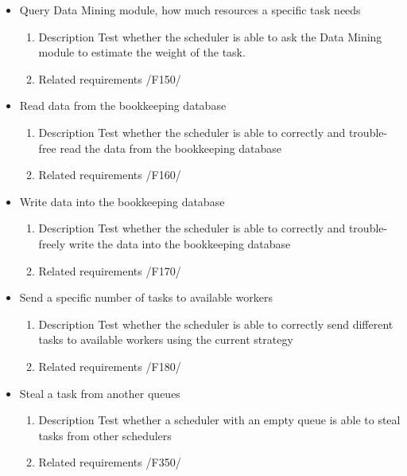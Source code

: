 {\begin{itemize}
				\item Query Data Mining module, how much resources a specific task needs
				\begin{enumerate}
					\item Description\newline
Test whether the scheduler is able to ask the Data Mining module to estimate the weight of the task.
					\item Related requirements\newline
						/F150/
				\end{enumerate}
				
				
				\item Read data from the bookkeeping database
				\begin{enumerate}
					\item Description\newline
Test whether the scheduler is able to correctly and trouble-free read the data from the bookkeeping database
					\item Related requirements\newline
						/F160/
				\end{enumerate}
				
				
				\item Write data into the bookkeeping database
				\begin{enumerate}
					\item Description\newline
Test whether the scheduler is able to correctly and trouble-freely write the data into the bookkeeping database
					\item Related requirements\newline
						/F170/
				\end{enumerate}
				
				
				\item Send a specific number of tasks to available workers
				\begin{enumerate}
					\item Description\newline
Test whether the scheduler is able to correctly send different tasks to available workers using the current strategy
					\item Related requirements\newline
						/F180/
				\end{enumerate}
								
			
			
			
				\item Steal a task from another queues
				\begin{enumerate}
					\item Description\newline
Test whether a scheduler with an empty queue is able to steal tasks from other schedulers
					\item Related requirements\newline
						/F350/
				\end{enumerate}
							

\end{itemize}}
